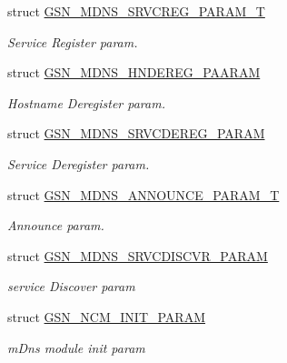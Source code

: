\begin{DoxyCompactItemize}
struct \hyperlink{a00149}{GSN\_\-MDNS\_\-SRVCREG\_\-PARAM\_\-T}
\begin{DoxyCompactList}\small\item\em Service Register param. \end{DoxyCompactList}\item 
struct \hyperlink{a00142}{GSN\_\-MDNS\_\-HNDEREG\_\-PAARAM}
\begin{DoxyCompactList}\small\item\em Hostname Deregister param. \end{DoxyCompactList}\item 
struct \hyperlink{a00147}{GSN\_\-MDNS\_\-SRVCDEREG\_\-PARAM}
\begin{DoxyCompactList}\small\item\em Service Deregister param. \end{DoxyCompactList}\item 
struct \hyperlink{a00141}{GSN\_\-MDNS\_\-ANNOUNCE\_\-PARAM\_\-T}
\begin{DoxyCompactList}\small\item\em Announce param. \end{DoxyCompactList}\item 
struct \hyperlink{a00148}{GSN\_\-MDNS\_\-SRVCDISCVR\_\-PARAM}
\begin{DoxyCompactList}\small\item\em service Discover param \end{DoxyCompactList}\item 
struct \hyperlink{a00159}{GSN\_\-NCM\_\-INIT\_\-PARAM}
\begin{DoxyCompactList}\small\item\em mDns module init param \end{DoxyCompactList}\end{DoxyCompactItemize}

